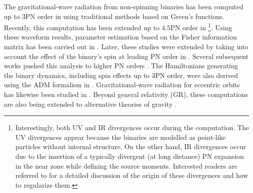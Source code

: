 The gravitational-wave radiation from non-spinning binaries has been computed up to 3PN order in \cite{Tagoshi:2000zg, Faye:2006gx, Blanchet:2006gy, Blanchet:2004ek, Damour:2000ni, Itoh:2003fy,Boetzel:2019nfw,Faye:2012we,Mishra:2013rna} using traditional methods based on Green's functions. Recently, this computation has been extended up to 4.5PN order in \cite{Fujita:2010xj,Faye:2014fra, Blanchet:2023sbv,Blanchet:2023bwj} \footnote{Interestingly, both UV and IR divergences occur during the computation. The UV divergences appear because the binaries are modelled as point-like particles without internal structure. On the other hand, IR divergences occur due to the insertion of a typically divergent (at long distance) PN expansion in the near zone while defining the source moments. Interested readers are referred to \cite{Larrouturou:2021gqo, Blanchet:2004bb,Blanchet:2023soy} for a detailed discussion of the origin of these divergences and how to regularize them.}. Using these waveform results, parameter estimation based on the Fisher information matrix has been carried out in \cite{Arun:2004hn}. Later, these studies were extended by taking into account the effect of the binary's spin at leading PN order in \cite{PhysRevD.12.329, PhysRevD.2.1428, Kidder:1992fr}. Several subsequent works pushed this analysis to higher PN orders \cite{Cho:2022syn}. The Hamiltonians generating the binary dynamics, including spin effects up to 3PN order, were also derived using the ADM formalism in \cite{Steinhoff:2007mb, Steinhoff:2008ji, Hergt:2008jn, Hergt:2010pa,Porto:2012as}. Gravitational-wave radiation for eccentric orbits has likewise been studied in \cite{Enoki:2006kj, Favata:2011qi, Munna:2019fjz}. Beyond general relativity (GR), these computations are also being extended to alternative theories of gravity \cite{Zhang:2017srh,AbhishekChowdhuri:2022ora, Zhang:2018prg,Saffer:2018jmx, Lin:2018ken,Li:2022grj,Shiralilou:2021mfl,Julie:2019sab}.
\par

